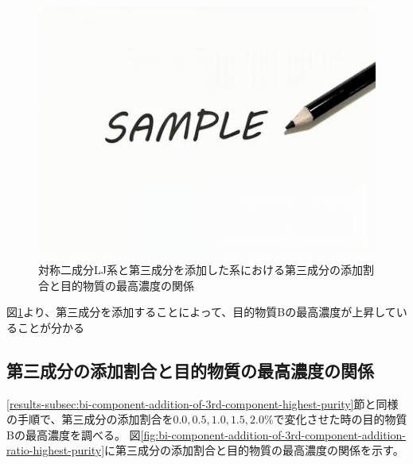 \documentclass[titlepage]{jsreport}
\begin{document}
\begin{figure}[htbp]
    \begin{center}
        \includegraphics[width=14cm]{fig/sample.jpeg}
    \end{center}
    \caption{対称二成分LJ系と第三成分を添加した系における第三成分の添加割合と目的物質の最高濃度の関係}
    \label{fig:bi-component-addition-of-3rd-component-highest-purity}
\end{figure}

\newpage
図\ref{fig:bi-component-addition-of-3rd-component-highest-purity}より、第三成分を添加することによって、目的物質Bの最高濃度が上昇していることが分かる

\newpage
\subsection{第三成分の添加割合と目的物質の最高濃度の関係} \label{results-subsec:bi-component-addition-of-3rd-component-addition-ratio-highest-purity}
\ref{results-subsec:bi-component-addition-of-3rd-component-highest-purity}節と同様の手順で、第三成分の添加割合を$0.0,0.5,1.0,1.5,2.0\%$で変化させた時の目的物質Bの最高濃度を調べる。
図\ref{fig:bi-component-addition-of-3rd-component-addition-ratio-highest-purity}に第三成分の添加割合と目的物質の最高濃度の関係を示す。
\end{document}
